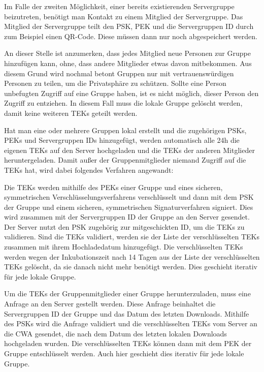 \documentclass[conference,compsoc]{IEEEtran}
\begin{document}
Im Falle der zweiten Möglichkeit, einer bereits existierenden Servergruppe beizutreten, benötigt man Kontakt zu einem Mitglied der Servergruppe.
Das Mitglied der Servergruppe teilt den PSK, PEK und die Servergruppen ID durch zum Beispiel einen QR-Code.
Diese müssen dann nur noch abgespeichert werden.

An dieser Stelle ist anzumerken, dass jedes Mitglied neue Personen zur Gruppe hinzufügen kann, ohne, dass andere Mitglieder etwas davon mitbekommen.
Aus diesem Grund wird nochmal betont Gruppen nur mit vertrauenswürdigen Personen zu teilen, um die Privatsphäre zu schützen.
Sollte eine Person unbefugten Zugriff auf eine Gruppe haben, ist es nicht möglich, dieser Person den Zugriff zu entziehen.
In diesem Fall muss die lokale Gruppe gelöscht werden, damit keine weiteren TEKs geteilt werden.

Hat man eine oder mehrere Gruppen lokal erstellt und die zugehörigen PSKs, PEKs und Servergruppen IDs hinzugefügt, 
werden automatisch alle 24h die eigenen TEKs auf den Server hochgeladen und die TEKs der anderen Mitglieder heruntergeladen.
Damit außer der Gruppenmitglieder niemand Zugriff auf die TEKs hat, wird dabei folgendes Verfahren angewandt:

Die TEKs werden mithilfe des PEKs einer Gruppe und eines sicheren, symmetrischen Verschlüsselungsverfahrens verschlüsselt und 
dann mit dem PSK der Gruppe und einem sicheren, symmetrischen Signaturverfahren signiert.
Dies wird zusammen mit der Servergruppen ID der Gruppe an den Server gesendet.
Der Server nutzt den PSK zugehörig zur mitgeschickten ID, um die TEKs zu validieren.
Sind die TEKs validiert, werden sie der Liste der verschlüsselten TEKs zusammen mit ihrem Hochladedatum hinzugefügt.
Die verschlüsselten TEKs werden wegen der Inkubationszeit nach 14 Tagen aus der Liste der verschlüsselten TEKs gelöscht, da sie danach nicht mehr benötigt werden.
Dies geschieht iterativ für jede lokale Gruppe.

Um die TEKs der Gruppenmitglieder einer Gruppe herunterzuladen, muss eine Anfrage an den Server gestellt werden.
Diese Anfrage beinhaltet die Servergruppen ID der Gruppe und das Datum des letzten Downloads.
Mithilfe des PSKs wird die Anfrage validiert und die verschlüsselten TEKs vom Server an die CWA gesendet, die nach dem Datum des letzten lokalen Downloads hochgeladen wurden.
Die verschlüsselten TEKs können dann mit dem PEK der Gruppe entschlüsselt werden.
Auch hier geschieht dies iterativ für jede lokale Gruppe.\\
\end{document}
